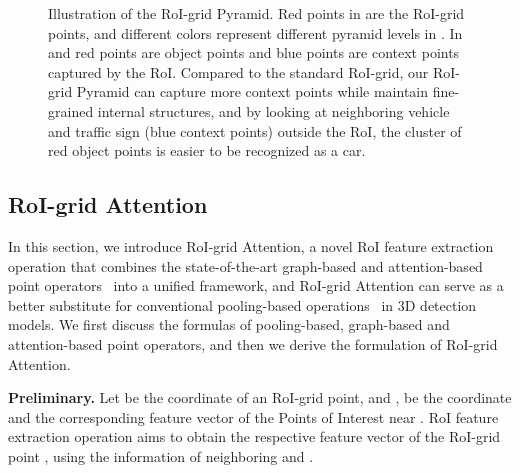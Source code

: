 \documentclass[10pt,twocolumn,letterpaper]{article}
\begin{document}
\begin{figure}[!t] \centering   
{}    
\caption{Illustration of the RoI-grid Pyramid. Red points in  are the RoI-grid points, and different colors represent different pyramid levels in . In  and  red points are object points and blue points are context points captured by the RoI. Compared to the standard RoI-grid, our RoI-grid Pyramid can capture more context points while maintain fine-grained internal structures, and by looking at neighboring vehicle and traffic sign (blue context points) outside the RoI, the cluster of red object points is easier to be recognized as a car.}     
\label{fig_pyramid} 
\vspace{-4mm}
\end{figure}


\subsection{RoI-grid Attention} \label{RoI-grid Attention}
In this section, we introduce RoI-grid Attention, a novel RoI feature extraction operation that combines the state-of-the-art graph-based and attention-based point operators~\cite{wang2019dynamic, vaswani2017attention, zhao2020point} into a unified framework, and RoI-grid Attention can serve as a better substitute for conventional pooling-based operations~\cite{shi2020pv, deng2020voxel, shi2021pv} in 3D detection models. We first discuss the formulas of pooling-based, graph-based and attention-based point operators, and then we derive the formulation of RoI-grid Attention.

\textbf{Preliminary.} Let  be the coordinate of an RoI-grid point, and ,  be the coordinate and the corresponding feature vector of the  Points of Interest near . RoI feature extraction operation aims to obtain the respective feature vector  of the RoI-grid point , using the information of neighboring  and . 
\end{document}

